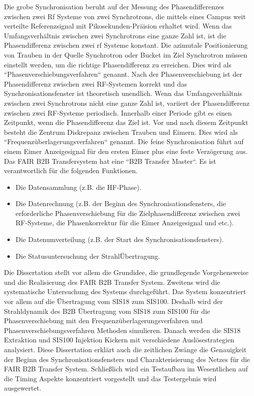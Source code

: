 Die grobe Synchronisation beruht auf der Messung des Phasendifferenzes zwischen zwei Rf Systeme von zwei Synchrotrons, die mittels eines Campus weit verteilte Referenzsignal mit Pikosekunden-Pr\"aision erhaltet wird. Wenn das Umfangsverhältnis zwischen zwei Synchrotrons eine ganze Zahl ist, ist die Phasendifferenz zwischen zwei rf Systeme konstant. Die azimutale Positionierung von Trauben in der Quelle Synchrotron oder Bucket im Ziel Synchrotron m\"ussen einstellt werden, um die richtige Phasendifferenz zu erreichen. Dies wird als ``Phasenverschiebungsverfahren`` genannt. Nach der Phasenverschiebung ist der Phasendifferenz zwischen zwei RF-Systemen  	korrekt und das Synchronisationsfenster ist theoretisch unendlich. Wenn das Umfangsverhältnis zwischen zwei Synchrotrons nicht eine ganze Zahl ist, variiert der Phasendifferenz zwischen zwei RF-Systeme periodisch. Innerhalb einer Periode gibt es einen Zeitpunkt, wenn die Phasendifferenz das Ziel ist. Vor und nach diesem Zeitpunkt besteht die Zentrum Diskrepanz zwischen Trauben und Eimern. Dies wird als ``Frequenzüberlagerungsverfahren`` genannt. Die feine Synchronisation f\"uhrt auf einem Eimer Anzeigesignal für den ersten Eimer plus eine feste Verzögerung aus. Das FAIR B2B Transfersystem hat eine ``B2B Transfer Master``. Es ist verantwortlich f\"ur die folgenden Funktionen.
\begin{itemize}

\item Die Datensammlung (z.B. die HF-Phase).
\item Die Datenrechnung (z.B. der Beginn des Synchronisationsfensters, die erforderliche Phasenverschiebung f\"ur die Zielphasendifferenz zwischen zwei RF-Systeme, die Phasenkorrektur f\"ur die Eimer Anzeigesignal und etc.).
\item Die Datenumverteilung (z.B. der Start des Synchronisationsfensters).
\item Die Statusuntersuchung der Strahl\"Ubertragung.
\end{itemize}

Die Dissertation stellt vor allem die Grundidee, die grundlegende Vorgehensweise und die Realisierung des FAIR B2B Transfer System. Zweitens wird die systematische Untersuchung des Systems durchgeführt. Das System konzentriert vor allem auf die \"Ubertragung vom SIS18 zum SIS100. Deshalb wird der Strahldynamik des B2B Übertragung vom SIS18 zum SIS100 f\"ur die Phasenverschiebung mit den Frequenzüberlagerungsverfahren und Phasenverschiebungsverfahren Methoden simulieren. Danach werden die SIS18 Extraktion und SIS100 Injektion Kickern mit verschiedene Auslösestrategien analysiert. Diese Dissertation erkl\"art auch die zeitlichen Zwänge die Genauigkeit der Beginn des Synchronisationsfensters und Charakterisierung des Netzes f\"ur die FAIR B2B Transfer System. Schließlich wird ein Testaufbau im Wesentlichen auf die Timing Aspekte konzentriert vorgestellt und das Testergebnis wird ausgewertet.